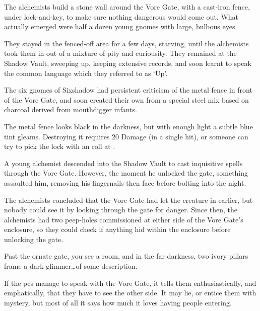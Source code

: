 \begin{exampletext}
  The alchemists build a stone wall around the Vore Gate, with a cast-iron fence, under lock-and-key, to make sure nothing dangerous would come out.
  What actually emerged were half a dozen young gnomes with large, bulbous eyes.

  They stayed in the fenced-off area for a few days, starving, until the alchemists took them in out of a mixture of pity and curiousity.
  They remained at the Shadow Vault, sweeping up, keeping extensive records, and soon learnt to speak the common language which they referred to as `Up'.

  The six gnomes of Sixshadow had persistent criticism of the metal fence in front of the Vore Gate, and soon created their own from a special steel mix based on charcoal derived from mouthdigger infants.
\end{exampletext}

The metal fence looks black in the darkness, but with enough light a subtle blue tint gleams.
Destroying it requires 20 Damage (in a single hit), or someone can try to pick the lock with an  roll at \tn[16].

\shadowVaultMap


\begin{exampletext}
  A young alchemist descended into the Shadow Vault to cast inquisitive spells through the Vore Gate.
  However, the moment he unlocked the gate, something assaulted him, removing his fingernails then face before bolting into the night.

  The alchemists concluded that the Vore Gate had let the creature in earlier, but nobody could see it by looking through the gate for danger.
  Since then, the alchemists had two peep-holes commissioned at either side of the Vore Gate's enclosure, so they could check if anything hid within the enclosure before unlocking the gate.
\end{exampletext}

\begin{boxtext}
  Past the ornate gate, you see a room, and in the far darkness, two ivory pillars frame a dark glimmer\ldots of some description.
\end{boxtext}

If the \glspl{pc} manage to speak with the Vore Gate, it tells them enthusiastically, and emphatically, that they have to see the other side.
It may lie, or entice them with mystery, but most of all it says how much it loves having people entering.


